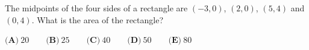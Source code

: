 The midpoints of the four sides of a rectangle are $(-3,0)$, $(2,0)$, $(5,4)$ and $(0,4)$. What is the area of the rectangle?

$\textbf{(A)}\ 20\qquad\textbf{(B)}\ 25\qquad\textbf{(C)}\ 40\qquad\textbf{(D)}\ 50\qquad\textbf{(E)}\ 80$
